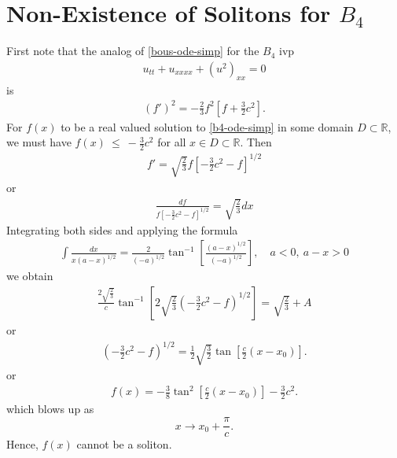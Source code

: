 \documentclass[12pt,reqno]{amsart}
\numberwithin{equation}{section}  %
\newcommand{\rr}{\mathbb{R}}
\begin{document}
\section{Non-Existence of Solitons for $B_{4}$} 
\label{sec:B4-soliton-fail}
%
%
First note that the
analog of \eqref{bous-ode-simp} for the $B_{4}$ ivp
\begin{equation}
  \label{b4}
\begin{split}
  u_{tt} + u_{xxxx} + (u^{2})_{xx} = 0
\end{split}
\end{equation}
is
\begin{equation}
  \label{b4-ode-simp}
\begin{split}
  (f')^{2} = -\frac{2}{3} f^{2} \left [ f + \frac{3}{2}c^{2}\right ]. 
\end{split}
\end{equation}
For $f(x)$ to be a real valued solution to \eqref{b4-ode-simp} in some domain
$D \subset \rr$, we must have $f(x)~\le~-\frac{3}{2}c^{2}$ for all
$x \in D \subset \rr$. Then 
%
\begin{equation*}
\begin{split}
  f' = \sqrt{\frac{2}{3}}f \left[ -\frac{3}{2}c^{2} -f \right]^{1/2}
\end{split}
\end{equation*}
%
%
or
%
%
\begin{equation*}
\begin{split}
\frac{df}{ f \left[ -\frac{3}{2}c^{2} -f \right]^{1/2}} = \sqrt{\frac{2}{3}}
dx
\end{split}
\end{equation*}
%
Integrating both sides and applying the formula
%
%
\begin{equation*}
\begin{split}
  \int \frac{dx}{x(a-x)^{1/2}} = \frac{2}{(-a)^{1/2}} \tan^{-1}\left[
  \frac{(a-x)^{1/2}}{(-a)^{1/2}}
  \right], \quad a < 0,\ a -x >0
\end{split}
\end{equation*}
%
%
we obtain
%
%
\begin{equation*}
\begin{split}
  \frac{2\sqrt{\frac{2}{3}}}{c} \tan^{-1}\left[ 2
  \sqrt{\frac{2}{3}}(-\frac{3}{2} c^{2} -f)^{1/2}
  \right] = \sqrt{\frac{2}{3}} + A
\end{split}
\end{equation*}
%
%
or
%
%
\begin{equation*}
\begin{split}
  (-\frac{3}{2} c^{2}-f)^{1/2} = \frac{1}{2} \sqrt{\frac{3}{2}} \tan\left[
  \frac{c}{2}(x- x_{0})
  \right].
\end{split}
\end{equation*}
%
%
or
%
%
\begin{equation*}
\begin{split}
  f(x) = -\frac{3}{8} \tan^{2}\left[ \frac{c}{2}(x- x_{0}) \right] - \frac{3}{2}c^{2}.
\end{split}
\end{equation*}
%
%
%
%
which blows up as $$ x \to x_{0} + \frac{\pi}{c}.$$ Hence, $f(x)$ cannot be a
soliton.
%
%
\end{document}
